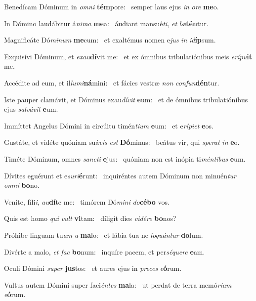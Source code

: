 \item Benedícam Dóminum in \textit{omni} \textbf{tém}pore:~\psstar{} semper laus ejus \textit{in} \textit{ore} \textbf{me}o.
\item In Dómino laudábitur á\textit{nima} \textbf{me}a:~\psstar{} áudiant mansué\textit{ti}, \textit{et} \textit{læ}\textbf{tén}tur.
\item Magnificáte Dó\textit{minum} \textbf{me}\-cum:~\psstar{} et exaltémus nomen e\textit{jus} \textit{in} \textit{id}\textbf{íp}sum.
\item Exquisívi Dóminum, et \textit{exau}\textbf{dí}vit me:~\psstar{} et ex ómnibus tribulatiónibus meis \textit{erípu}\textbf{it} me.
\item Accédite ad eum, et il\textit{lumi}\textbf{ná}mini:~\psstar{} et fácies vestræ \textit{non} \textit{confun}\textbf{dén}tur.
\item Iste pauper clamávit, et Dóminus exau\textit{dívit} \textbf{e}um:~\psstar{} et de ómnibus tribulatiónibus ejus \textit{salvávit} \textbf{e}um.
\item Immíttet Angelus Dómini in circúitu timén\textit{tium} \textbf{e}um:~\psstar{} et e\textit{rípiet} \textbf{e}os.
\item Gustáte, et vidéte quóniam suá\textit{vis} \textit{est} \textbf{Dó}minus:~\psstar{} beátus vir, qui \textit{sperat} \textit{in} \textbf{e}o.
\item Timéte Dóminum, omnes \textit{sancti} \textbf{e}jus:~\psstar{} quóniam non est inópia ti\textit{méntibus} \textbf{e}um.
\item Dívites eguérunt et e\textit{suri}\textbf{é}\-runt:~\psstar{} inquiréntes autem Dóminum non minuén\textit{tur} \textit{omni} \textbf{bo}no.
\item Veníte, fíli\textit{i}, \textit{au}\textbf{dí}te me:~\psstar{} timórem Dó\textit{mini} \textit{do}\textbf{cé}\textbf{bo} vos.
\item Quis est homo \textit{qui} \textit{vult} \textbf{vi}tam:~\psstar{} díligit dies \textit{vidére} \textbf{bo}nos?
\item Próhibe linguam tu\textit{am} \textit{a} \textbf{ma}lo:~\psstar{} et lábia tua ne \textit{loquántur} \textbf{do}lum.
\item Divérte a malo, \textit{et} \textit{fac} \textbf{bo}num:~\psstar{} inquíre pacem, et per\textit{séquere} \textbf{e}am.
\item Oculi Dómini \textit{super} \textbf{jus}tos:~\psstar{} et aures ejus in \textit{preces} \textit{e}\textbf{ó}rum.
\item Vultus autem Dómini super faci\textit{éntes} \textbf{ma}la:~\psstar{} ut perdat de terra memó\textit{riam} \textit{e}\textbf{ó}rum.
